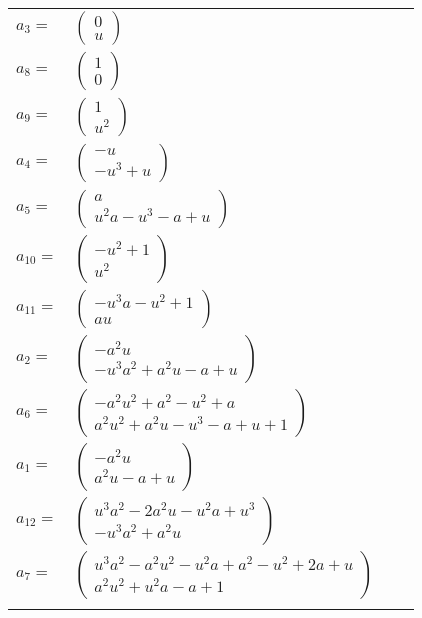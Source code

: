\documentclass[1p]{elsarticle_modified}
\theoremstyle{definition}
\begin{document}
\begin{tabular}{m{7pt} m{180pt} m{7pt} m{180pt} }
\flushright $a_{3}=$&$\begin{pmatrix}0\\u\end{pmatrix}$ \\
\flushright $a_{8}=$&$\begin{pmatrix}1\\0\end{pmatrix}$ \\
\flushright $a_{9}=$&$\begin{pmatrix}1\\u^2\end{pmatrix}$ \\
\flushright $a_{4}=$&$\begin{pmatrix}- u\\- u^3+u\end{pmatrix}$ \\
\flushright $a_{5}=$&$\begin{pmatrix}a\\u^2 a- u^3- a+u\end{pmatrix}$ \\
\flushright $a_{10}=$&$\begin{pmatrix}- u^2+1\\u^2\end{pmatrix}$ \\
\flushright $a_{11}=$&$\begin{pmatrix}- u^3 a- u^2+1\\a u\end{pmatrix}$ \\
\flushright $a_{2}=$&$\begin{pmatrix}- a^2 u\\- u^3 a^2+a^2 u- a+u\end{pmatrix}$ \\
\flushright $a_{6}=$&$\begin{pmatrix}- a^2 u^2+a^2- u^2+a\\a^2 u^2+a^2 u- u^3- a+u+1\end{pmatrix}$ \\
\flushright $a_{1}=$&$\begin{pmatrix}- a^2 u\\a^2 u- a+u\end{pmatrix}$ \\
\flushright $a_{12}=$&$\begin{pmatrix}u^3 a^2-2 a^2 u- u^2 a+u^3\\- u^3 a^2+a^2 u\end{pmatrix}$ \\
\flushright $a_{7}=$&$\begin{pmatrix}u^3 a^2- a^2 u^2- u^2 a+a^2- u^2+2 a+u\\a^2 u^2+u^2 a- a+1\end{pmatrix}$\\&\end{tabular}
\end{document}
